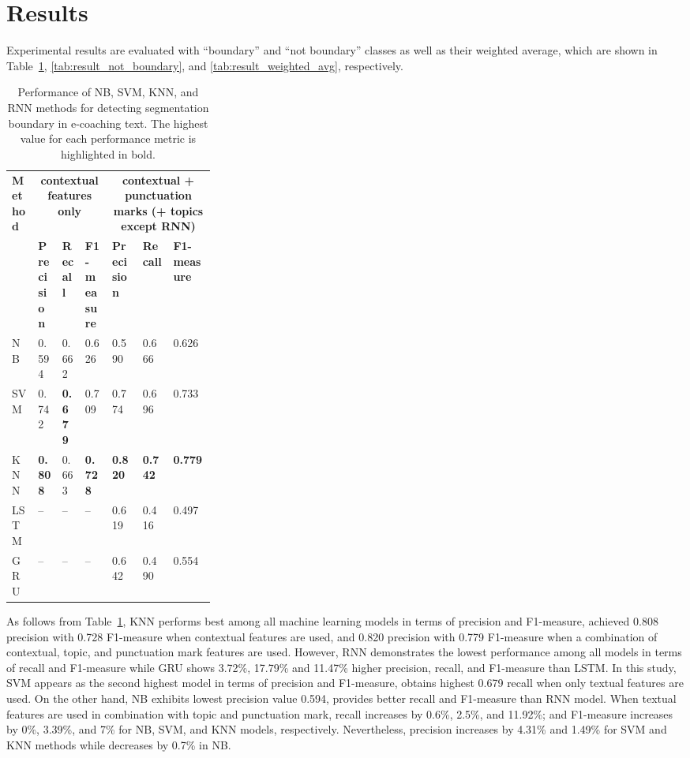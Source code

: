 \documentclass{amia}
\begin{document}
\section*{Results}
Experimental results are evaluated with ``boundary'' and ``not boundary'' classes as well as their weighted average, which are shown in Table~\ref{tab:result_boundary}, \ref{tab:result_not_boundary}, and \ref{tab:result_weighted_avg}, respectively.\\

\begin{table}[ht]
\centering
\caption{Performance of NB, SVM, KNN, and RNN methods for detecting segmentation boundary in e-coaching text. The highest value for each performance metric is highlighted in bold.}
\label{tab:result_boundary}
  \begin{tabular}{|l|l|l|l|p{0.15\linewidth}|p{0.15\linewidth}|l|}
  \hline
   \multirow{2}{*}{\textbf{Method}} & \multicolumn{3}{|c|}{\textbf{contextual features only}} & \multicolumn{3}{|c|}{\textbf{contextual + punctuation marks (+ topics except RNN)}} \\\cline{2-7}
   & \textbf{Precision}  & \textbf{Recall} & \textbf{F1-measure} & \textbf{Precision}  & \textbf{Recall} & \textbf{F1-measure}\\ \hline    
    
 NB & 0.594 & 0.662 & 0.626 & 0.590 & 0.666 & 0.626 \\ \hline
 SVM & 0.742 & \textbf{0.679} & 0.709 & 0.774 & 0.696 & 0.733\\ \hline
 KNN & \textbf{0.808} & 0.663 & \textbf{0.728} & \textbf{0.820} & \textbf{0.742} & \textbf{0.779}\\ \hline
 LSTM & -- & -- & -- & 0.619 & 0.416 & 0.497  \\ \hline
 GRU & -- & -- & -- & 0.642 & 0.490 & 0.554 \\ \hline 
  \end{tabular}
\end{table}                 

As follows from Table~\ref{tab:result_boundary}, KNN performs best among all machine learning models in terms of precision and F1-measure, achieved 0.808 precision with 0.728 F1-measure when contextual features are used, and 0.820 precision with 0.779 F1-measure when a combination of contextual, topic, and punctuation mark features are used. However, RNN demonstrates the lowest performance among all models in terms of recall and F1-measure while GRU shows 3.72\%, 17.79\% and 11.47\% higher precision, recall, and F1-measure than LSTM. In this study, SVM appears as the second highest model in terms of precision and F1-measure, obtains highest 0.679 recall when only textual features are used. On the other hand, NB exhibits lowest precision value 0.594, provides better recall and F1-measure than RNN model. When textual features are used in combination with topic and punctuation mark, recall increases by 0.6\%, 2.5\%, and 11.92\%; and F1-measure increases by 0\%, 3.39\%, and 7\% for NB, SVM, and KNN models, respectively. Nevertheless, precision increases by 4.31\% and 1.49\% for SVM and KNN methods while decreases by 0.7\% in NB. \\
\end{document}
